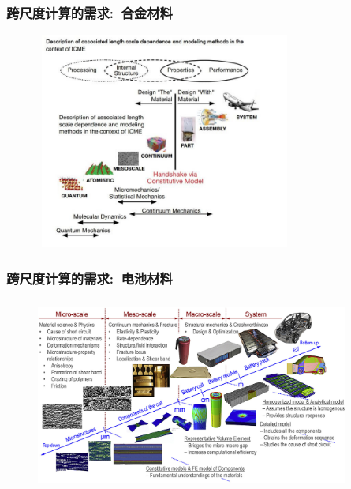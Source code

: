 \frame
{
	\frametitle{跨尺度计算的需求:~合金材料}
\begin{figure}[h!]
\vspace*{-0.20in}
\centering
\includegraphics[height=2.80in,width=3.35in,viewport=0 0 170 150,clip]{Figures/Multi_Scale-6.jpg}
\label{Alloy-Multi_Scale}
\end{figure}
}

\frame
{
	\frametitle{跨尺度计算的需求:~电池材料}
\begin{figure}[h!]
\vspace*{-0.13in}
\centering
\includegraphics[height=2.50in,width=4.05in,viewport=0 0 224 125,clip]{Figures/Multiple_scales-Battery_cell.jpg}
\label{Battery_Cell-Multi_Scale}
\end{figure}
}

